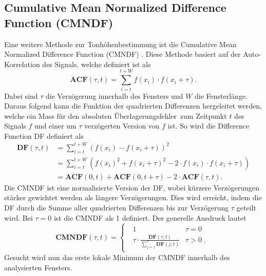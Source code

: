 \subsection{Cumulative Mean Normalized Difference Function (CMNDF)
\label{autotune:subsection:cumultativeMeanNormalizedDifferenceFunction}}
Eine weitere Methode zur Tonhöhenbestimmung ist die Cumulative Mean Normalized Difference Function (CMNDF) \cite{autotune:f0EstimationForTheElectricGuitar}.
Diese Methode basiert auf der Auto-Korrelation des Signals, welche definiert ist als
\begin{equation}
    \mathbf{ACF}(\tau, t)
    =
    \sum_{i=t}^{t+W}f(x_i)\cdot f(x_i+\tau).
\end{equation}
Dabei sind $\tau$ die Verzögerung innerhalb des Fensters und $W$ die Fensterlänge.
Daraus folgend kann die Funktion der quadrierten Differenzen hergeleitet werden,
welche ein Mass für den absoluten \glqq Überlagerungsfehler\grqq\ zum Zeitpunkt $t$ des Signals $f$ und einer um $\tau$ verzögerten Version von $f$ ist.
So wird die Difference Function DF definiert als
\begin{equation}
    \begin{aligned}
        \mathbf{DF}(\tau,t)
        &= \sum_{i=t}^{t+W}\left(f(x_i)-f(x_i+\tau)\right)^2 \\
        &= \sum_{i=t}^{t+W}\left(f(x_i)^2+f(x_i+\tau)^2-2 \cdot f(x_i) \cdot f(x_i + \tau)\right) \\
        &= \mathbf{ACF}(0,t)+\mathbf{ACF}(0,t+\tau)-2\cdot \mathbf{ACF}(\tau,t).
    \end{aligned}
\end{equation}
Die CMNDF ist eine normalisierte Version der DF,
wobei kürzere Verzögerungen stärker gewichtet werden als längere Verzögerungen.
Dies wird erreicht, indem die DF durch die Summe aller quadrierten Differenzen bis zur Verzögerung $\tau$ geteilt wird.
Bei $\tau=0$ ist die CMNDF als 1 definiert.
Der generelle Ausdruck lautet
\begin{equation}
    \mathbf{CMNDF}(\tau,t)
    =
    \begin{cases}
        \;\begin{array}{ll} 1 & \tau=0 \\
        \tau \cdot \frac{\mathbf{DF}(\tau,t)}{\sum\nolimits_{j=1}^{\tau} \mathbf{DF}(j,t)} & \tau > 0\;. \end{array}
        \end{cases}
\end{equation}
Gesucht wird nun das erste lokale Minimum der CMNDF innerhalb des analysierten Fensters.
